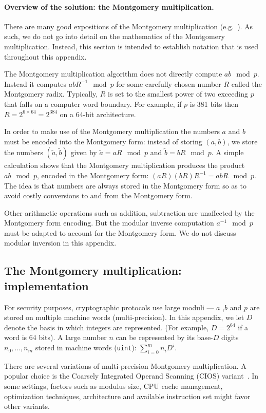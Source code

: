 \documentclass[journal=tches,spthm]{iacrtrans}
\begin{document}
\paragraph{Overview of the solution: the Montgomery multiplication.}
There are many good expositions of the Montgomery multiplication
(e.g.~\cite{EPRINT:BosMon17}). As such, we do not go into detail on the
mathematics of the Montgomery multiplication. Instead, this section is intended
to establish notation that is used throughout this appendix.

The Montgomery multiplication algorithm does not directly compute $ab \mod p$.
Instead it computes $abR^{-1} \mod p$ for some carefully chosen number $R$
called the Montgomery radix. Typically, $R$ is set to the smallest power of two
exceeding $p$ that falls on a computer word boundary. For example, if $p$ is
381 bits then $R = 2^{6\times 64} = 2^{384}$ on a 64-bit architecture.

In order to make use of the Montgomery multiplication the numbers $a$ and $b$
must be encoded into the Montgomery form: instead of storing $(a,b)$, we store
the numbers $(\tilde{a}, \tilde{b})$ given by $\tilde{a}=aR \mod p$ and
$\tilde{b}=bR \mod p$.  A simple calculation shows that the Montgomery
multiplication produces the product $ab \mod p$, encoded in the Montgomery
form: $(aR)(bR)R^{-1}=abR \mod p$.  The idea is that numbers are always stored
in the Montgomery form so as to avoid costly conversions to and from the
Montgomery form.

Other arithmetic operations such as addition, subtraction are unaffected by the
Montgomery form encoding. But the modular inverse computation $a^{-1} \mod p$
must be adapted to account for the Montgomery form. We do not discuss modular
inversion in this appendix.

\subsection{The Montgomery multiplication: implementation}
For security purposes, cryptographic protocols use large moduli — $a$ ,$b$ and
$p$ are stored on multiple machine words (multi-precision). In this appendix,
we let $D$ denote the basis in which integers are represented. (For example,
$D=2^{64}$ if a word is 64 bits). A large number $n$ can be represented by its
base-$D$ digits $n_0, \dots, n_m$ stored in machine words (\texttt{uint}):
$\sum_{i=0}^m n_i D^i$.

There are several variations of multi-precision Montgomery multiplication. A
popular choice is the Coarsely Integrated Operand Scanning (CIOS)
variant~\cite{acar1998high-speed}.  In some settings, factors such as modulus
size, CPU cache management, optimization techniques, architecture and available
instruction set might favor other variants.
\end{document}
